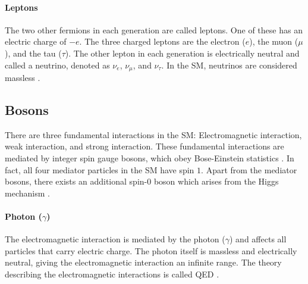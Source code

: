 \paragraph{Leptons} The two other fermions in each generation are called leptons. One of these has an electric charge of $-e$. The three charged leptons are the electron ($e$), the muon ($\mu$), and the tau ($\tau$). The other lepton in each generation is electrically neutral and called a neutrino, denoted as $\nu_e$, $\nu_\mu$, and $\nu_\tau$. In the \ac{SM}, neutrinos are considered massless \cite{Book-Thomson,Book-Griffiths}.

\subsection{Bosons}
There are three fundamental interactions in the \ac{SM}: Electromagnetic interaction, weak interaction, and strong interaction. These fundamental interactions are mediated by integer spin gauge bosons, which obey Bose-Einstein statistics \cite{BoseEinstein-Bose}. In fact, all four mediator particles in the \ac{SM} have spin $1$. Apart from the mediator bosons, there exists an additional spin-$0$ boson which arises from the Higgs mechanism \cite{Book-Thomson}.
\paragraph{Photon ($\gamma$)}
The electromagnetic interaction is mediated by the photon ($\gamma$) and affects all particles that carry electric charge. The photon itself is massless and electrically neutral, giving the electromagnetic interaction an infinite range. The theory describing the electromagnetic interactions is called \ac{QED} \cite{Book-Griffiths}.
